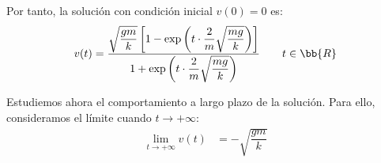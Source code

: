 \begin{ejercicio}
    Por tanto, la solución con condición inicial $v(0)=0$ es:
    \begin{equation*}
        v(t)=\dfrac{\sqrt{\dfrac{gm}{k}}\left[1-\exp\left(t\cdot \dfrac{2}{m}\sqrt{\dfrac{mg}{k}}\right)\right]}{1+\exp\left(t\cdot \dfrac{2}{m}\sqrt{\dfrac{mg}{k}}\right)} \qquad t\in \bb{R}
    \end{equation*}

    Estudiemos ahora el comportamiento a largo plazo de la solución. Para ello, consideramos el límite cuando $t\to +\infty$:
    \begin{align*}
        \lim_{t\to +\infty} v(t) &= -\sqrt{\dfrac{gm}{k}}
    \end{align*}

\end{ejercicio}

